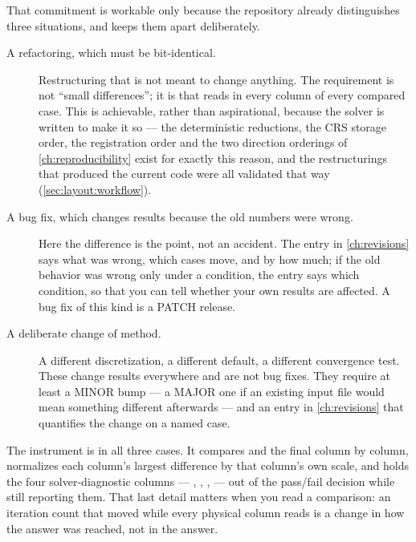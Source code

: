 That commitment is workable only because the repository already distinguishes
three situations, and keeps them apart deliberately.

\begin{description}

  \item[A refactoring, which must be bit-identical.] Restructuring that is not
    meant to change anything. The requirement is not ``small differences''; it is
    that  reads  in every column of
    every compared case. This is achievable, rather than aspirational, because
    the solver is written to make it so --- the deterministic reductions, the
    CRS storage order, the registration order and the two direction orderings
    of \cref{ch:reproducibility} exist for exactly this reason, and the
    restructurings that produced the current code were all validated that way
    (\cref{sec:layout:workflow}).

  \item[A bug fix, which changes results because the old numbers were wrong.]
    Here the difference is the point, not an accident. The entry in
    \cref{ch:revisions} says what was wrong, which cases move, and by how much;
    if the old behavior was wrong only under a condition, the entry says which
    condition, so that you can tell whether your own results are affected. A
    bug fix of this kind is a PATCH release.

  \item[A deliberate change of method.] A different discretization, a different
    default, a different convergence test. These change results everywhere and
    are not bug fixes. They require at least a MINOR bump --- a MAJOR one if an
    existing input file would mean something different afterwards --- and an
    entry in \cref{ch:revisions} that quantifies the change on a named case.

\end{description}

The instrument is  in all three cases. It compares
 and the final  column by column, normalizes
each column's largest difference by that column's own scale, and holds the four
solver-diagnostic columns --- , ,
,  --- out of the pass/fail decision while
still reporting them. That last detail matters when you read a comparison: an
iteration count that moved while every physical column reads 
is a change in how the answer was reached, not in the answer.

